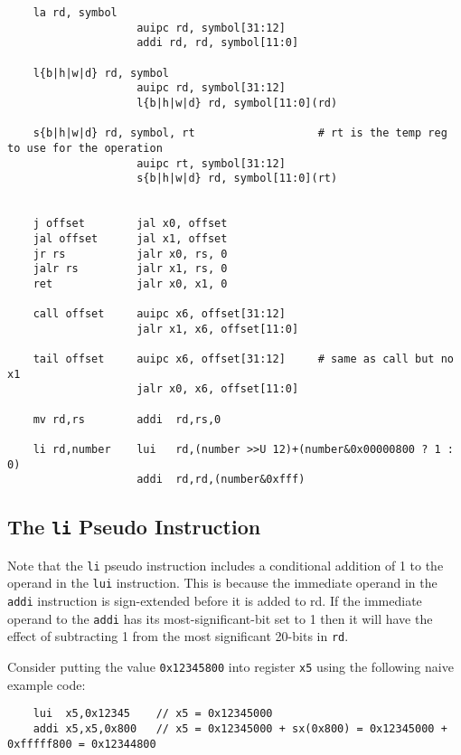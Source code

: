 %
\begin{verbatim}
    la rd, symbol
                    auipc rd, symbol[31:12]
                    addi rd, rd, symbol[11:0]

    l{b|h|w|d} rd, symbol
                    auipc rd, symbol[31:12]
                    l{b|h|w|d} rd, symbol[11:0](rd)

    s{b|h|w|d} rd, symbol, rt                   # rt is the temp reg to use for the operation
                    auipc rt, symbol[31:12]
                    s{b|h|w|d} rd, symbol[11:0](rt)


    j offset        jal x0, offset
    jal offset      jal x1, offset
    jr rs           jalr x0, rs, 0
    jalr rs         jalr x1, rs, 0
    ret             jalr x0, x1, 0

    call offset     auipc x6, offset[31:12]
                    jalr x1, x6, offset[11:0]

    tail offset     auipc x6, offset[31:12]     # same as call but no x1
                    jalr x0, x6, offset[11:0]

    mv rd,rs        addi  rd,rs,0

    li rd,number    lui   rd,(number >>U 12)+(number&0x00000800 ? 1 : 0)
                    addi  rd,rd,(number&0xfff)
\end{verbatim}

\subsection{The {\tt li} Pseudo Instruction}

Note that the {\tt li} pseudo instruction includes a conditional addition of 1 to the operand
in the {\tt lui} instruction.  This is because the immediate operand in the
{\tt addi} instruction is sign-extended before it is added to rd.  
If the immediate operand to the {\tt addi} has its most-significant-bit set to 1 then
it will have the effect of subtracting 1 from the most significant 20-bits in {\tt rd}.

Consider putting the value {\tt 0x12345800} into register {\tt x5} using the following
naive example code:

\begin{verbatim}
    lui  x5,0x12345    // x5 = 0x12345000
    addi x5,x5,0x800   // x5 = 0x12345000 + sx(0x800) = 0x12345000 + 0xfffff800 = 0x12344800
\end{verbatim}

